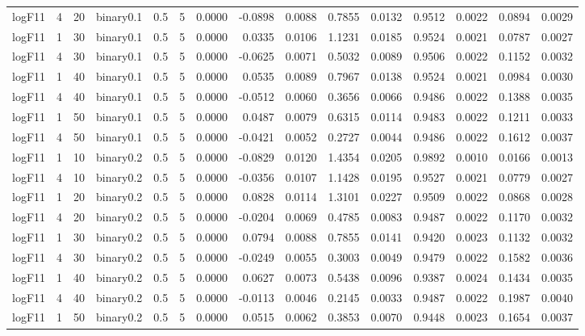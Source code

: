 \begin{longtable}{rrrrrrrrrrrrrrr}
  logF11 & 4 & 20 & binary0.1 & 0.5 & 5 & 0.0000 & -0.0898 & 0.0088 & 0.7855 & 0.0132 & 0.9512 & 0.0022 & 0.0894 & 0.0029 \\ 
  logF11 & 1 & 30 & binary0.1 & 0.5 & 5 & 0.0000 & 0.0335 & 0.0106 & 1.1231 & 0.0185 & 0.9524 & 0.0021 & 0.0787 & 0.0027 \\ 
  logF11 & 4 & 30 & binary0.1 & 0.5 & 5 & 0.0000 & -0.0625 & 0.0071 & 0.5032 & 0.0089 & 0.9506 & 0.0022 & 0.1152 & 0.0032 \\ 
  logF11 & 1 & 40 & binary0.1 & 0.5 & 5 & 0.0000 & 0.0535 & 0.0089 & 0.7967 & 0.0138 & 0.9524 & 0.0021 & 0.0984 & 0.0030 \\ 
  logF11 & 4 & 40 & binary0.1 & 0.5 & 5 & 0.0000 & -0.0512 & 0.0060 & 0.3656 & 0.0066 & 0.9486 & 0.0022 & 0.1388 & 0.0035 \\ 
  logF11 & 1 & 50 & binary0.1 & 0.5 & 5 & 0.0000 & 0.0487 & 0.0079 & 0.6315 & 0.0114 & 0.9483 & 0.0022 & 0.1211 & 0.0033 \\ 
  logF11 & 4 & 50 & binary0.1 & 0.5 & 5 & 0.0000 & -0.0421 & 0.0052 & 0.2727 & 0.0044 & 0.9486 & 0.0022 & 0.1612 & 0.0037 \\ 
  logF11 & 1 & 10 & binary0.2 & 0.5 & 5 & 0.0000 & -0.0829 & 0.0120 & 1.4354 & 0.0205 & 0.9892 & 0.0010 & 0.0166 & 0.0013 \\ 
  logF11 & 4 & 10 & binary0.2 & 0.5 & 5 & 0.0000 & -0.0356 & 0.0107 & 1.1428 & 0.0195 & 0.9527 & 0.0021 & 0.0779 & 0.0027 \\ 
  logF11 & 1 & 20 & binary0.2 & 0.5 & 5 & 0.0000 & 0.0828 & 0.0114 & 1.3101 & 0.0227 & 0.9509 & 0.0022 & 0.0868 & 0.0028 \\ 
  logF11 & 4 & 20 & binary0.2 & 0.5 & 5 & 0.0000 & -0.0204 & 0.0069 & 0.4785 & 0.0083 & 0.9487 & 0.0022 & 0.1170 & 0.0032 \\ 
  logF11 & 1 & 30 & binary0.2 & 0.5 & 5 & 0.0000 & 0.0794 & 0.0088 & 0.7855 & 0.0141 & 0.9420 & 0.0023 & 0.1132 & 0.0032 \\ 
  logF11 & 4 & 30 & binary0.2 & 0.5 & 5 & 0.0000 & -0.0249 & 0.0055 & 0.3003 & 0.0049 & 0.9479 & 0.0022 & 0.1582 & 0.0036 \\ 
  logF11 & 1 & 40 & binary0.2 & 0.5 & 5 & 0.0000 & 0.0627 & 0.0073 & 0.5438 & 0.0096 & 0.9387 & 0.0024 & 0.1434 & 0.0035 \\ 
  logF11 & 4 & 40 & binary0.2 & 0.5 & 5 & 0.0000 & -0.0113 & 0.0046 & 0.2145 & 0.0033 & 0.9487 & 0.0022 & 0.1987 & 0.0040 \\ 
  logF11 & 1 & 50 & binary0.2 & 0.5 & 5 & 0.0000 & 0.0515 & 0.0062 & 0.3853 & 0.0070 & 0.9448 & 0.0023 & 0.1654 & 0.0037 \\ 

\end{longtable}
